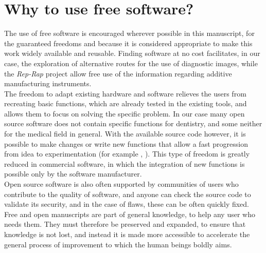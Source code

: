 \section{Why to use free software?}
The use of free software is encouraged wherever possible in this manuscript, for the guaranteed freedoms and because it is considered appropriate to make this work widely available and reusable. Finding software at no cost facilitates, in our case, the exploration of alternative routes for the use of diagnostic images, while the \emph{Rep-Rap} project \parencite{Reference62} allow free use of the information regarding additive manufacturing instruments. \\
The freedom to adapt existing hardware and software relieves the users from recreating basic functions, which are already tested in the existing tools, and allows them to focus on solving the specific problem.
In our case many open source software does not contain specific functions for dentistry, and some neither for the medical field in general. With the available source code however, it is possible to make changes or write new functions that allow a fast progression from idea to experimentation (for example \parencite{Reference63}, \parencite{Reference64}). This type of freedom is greatly reduced in commercial software, in which the integration of new functions is possible only by the software manufacturer. \\
Open source software is also often supported by communities of users who contribute to the quality of software, and anyone can check the source code to validate its security, and in the case of flaws, these can be often quickly fixed.\\
Free and open manuscripts are part of general knowledge, to help any user who needs them. They must therefore be preserved and expanded, to ensure that knowledge is not lost, and instead it is made more accessible to accelerate the general process of improvement to which the human beings boldly aims.